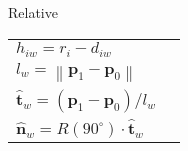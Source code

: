 Relative
\begin{table}[H]
\begin{tabular}{ll}
$ h_{iw} = r_{i} - d_{iw} $ & \\
$ l_{w} = \left\|\mathbf{p}_{1} - \mathbf{p}_{0}\right\| $ & \\
$ \hat{\mathbf{t}}_{w} = \left(\mathbf{p}_{1} - \mathbf{p}_{0}\right) / l_{w} $ & \\
$ \hat{\mathbf{n}}_{w} = R(90^{\circ}) \cdot \hat{\mathbf{t}}_{w} $ & \\
\end{tabular}
\end{table}
